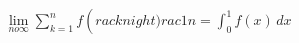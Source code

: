 \documentclass[preview]{standalone}
\begin{document}
\begin{align*}
\lim_{n 	o \infty} \sum_{k = 1}^{n} f\left ( rac{k}{n} 
ight ) rac{1}{n}  = \int_{0}^{1} f(x) \,dx
\end{align*}
\end{document}

